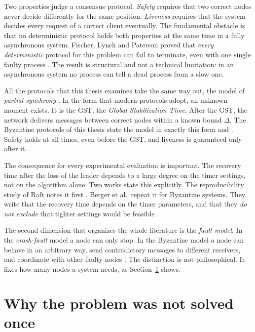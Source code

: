 Two properties judge a consensus protocol. \emph{Safety} requires that
two correct nodes never decide differently for the same position.
\emph{Liveness} requires that the system decides every request of a
correct client eventually. The fundamental obstacle is that no
deterministic protocol holds both properties at the same time in a fully
asynchronous system. Fischer, Lynch and Paterson proved that
\emph{every deterministic} protocol for this problem can fail to
terminate, even with one single faulty process
\cite{fischer1985impossibility}. The result is
structural and not a technical limitation: in an asynchronous system no
process can tell a dead process from a slow one.

All the protocols that this thesis examines take the same way out, the
model of \emph{partial synchrony} \cite{dwork1988consensus}. In the form
that modern protocols adopt, an unknown moment exists. It is the GST, the
\emph{Global Stabilization Time}. After the GST, the network delivers
messages between correct nodes within a known bound $\Delta$. The
Byzantine protocols of this thesis state the model in exactly this form
\cite{yin2019hotstuff} and \cite{malkhi2023hotstuff2}\prep. Safety holds
at all times, even before the GST, and liveness is guaranteed only after
it.

The consequence for every experimental evaluation is important. The
recovery time after the loss of the leader depends to a large degree on
the timer settings, not on the algorithm alone. Two works state this
explicitly. The reproducibility study of Raft notes it first
\cite{howard2015raftrefloated}. Berger et al.\ repeat it for Byzantine
systems. They write that the recovery time depends on the timer
parameters, and that they \emph{do not exclude} that tighter settings
would be feasible \cite{berger2023simulation}.

The second dimension that organizes the whole literature is the
\emph{fault model}. In the \emph{crash-fault} model a node can only
stop. In the Byzantine model a node can behave in an arbitrary way, send
contradictory messages to different receivers, and coordinate with other
faulty nodes \cite{lamport1982byzantine}. The distinction is not
philosophical. It fixes how many nodes a system needs, as
Section~\ref{sec:notonce} shows.

\section{Why the problem was not solved once}
\label{sec:notonce}

